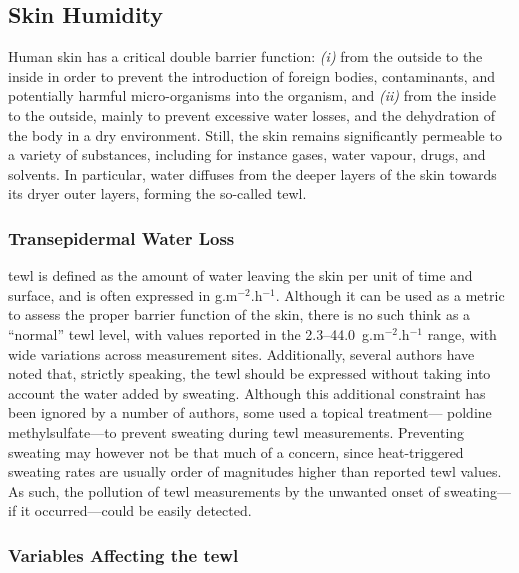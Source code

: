 \subsection{Skin Humidity}\label{sect:tcco2:skin_mes:rh}

Human skin has a critical double barrier function: \emph{(i)} from the outside to the inside in order to prevent the introduction of foreign bodies, contaminants, and potentially harmful micro-organisms into the organism, and \emph{(ii)} from the inside to the outside, mainly to prevent excessive water losses, and the dehydration of the body in a dry environment\cite{ehrhardt2008}. Still, the skin remains significantly permeable to a variety of substances, including for instance gases, water vapour, drugs, and solvents\cite{scheuplein1976, schaefer1982}. In particular, water diffuses from the deeper layers of the skin towards its dryer outer layers, forming the so-called \gls{tewl}.

\subsubsection{Transepidermal Water Loss}\label{subsect:tcco2:tewl}

\gls{tewl} is defined as the amount of water leaving the skin per unit of time and surface, and is often expressed in g.m$^{-2}$.h$^{-1}$. Although it can be used as a metric to assess the proper barrier function of the skin\cite{montero2021}, there is no such think as a \enquote{normal} \gls{tewl} level, with values reported in the 2.3--44.0~g.m$^{-2}$.h$^{-1}$ range, with wide variations across measurement sites\cite{kottner2013, akdeniz2018}. Additionally, several authors have noted that, strictly speaking, the \gls{tewl} should be expressed without taking into account the water added by sweating\cite{rogiers2001, fluhr2004bioengineering}. Although this additional constraint has been ignored by a number of authors, some used a topical treatment---\eg{} poldine methylsulfate---to prevent sweating during \gls{tewl} measurements\cite{grice1972}. Preventing sweating may however not be that much of a concern, since heat-triggered sweating rates are usually order of magnitudes higher than reported \gls{tewl} values\cite{cheuvront2009}. As such, the pollution of \gls{tewl} measurements by the unwanted onset of sweating---if it occurred---could be easily detected.

\subsubsection{Variables Affecting the \texorpdfstring{\gls{tewl}}{TEWL}}

